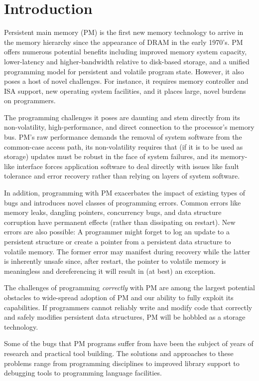 \section{Introduction}
\label{sec:introduction}

Persistent main memory (PM) is the first new memory technology to arrive in
the memory hierarchy since the appearance of DRAM in the early 1970's.  PM offers
numerous potential benefits including improved memory system capacity,
lower-latency and higher-bandwidth relative to disk-based storage, and a unified programming model for
persistent and volatile program state.  However, it also poses a host of novel
challenges.  For instance, it requires memory controller and ISA support, new operating
system facilities, and it places large, novel burdens on programmers.

The programming challenges it poses are daunting and stem directly from its
non-volatility, high-performance, and direct connection to the processor's
memory bus.  PM's raw performance demands the removal of system
software from the common-case access path, its non-volatility requires that (if
it is to be used as storage) updates must be robust in the face of system failures,
and its memory-like interface forces application software to deal directly with issues
like fault tolerance and error recovery rather than relying on layers of system software.

In addition, programming with PM exacerbates the impact of existing types of
bugs and introduces novel classes of programming errors.  Common
errors like memory leaks, dangling pointers, concurrency bugs, and data structure corruption have
permanent effects (rather than dissipating on restart).
New errors are also possible: A programmer might forget to log an update to a
persistent structure or create a pointer from a persistent data structure to
volatile memory.  The former error may manifest during recovery
while the latter is inherently unsafe since, after restart, the pointer to
volatile memory is meaningless and dereferencing it will result in (at best) an
exception.

The challenges of programming \emph{correctly} with PM are among the largest
potential obstacles to wide-spread adoption of PM and our ability to fully
exploit its capabilities.  If programmers cannot reliably write and modify code
that correctly and safely modifies persistent data structures, PM will be
hobbled as a storage technology.

Some of the bugs that PM programs suffer from have been the subject of
years of research and practical tool building.  The solutions and approaches to
these problems range from programming disciplines to improved library support
to debugging tools to programming language facilities.

